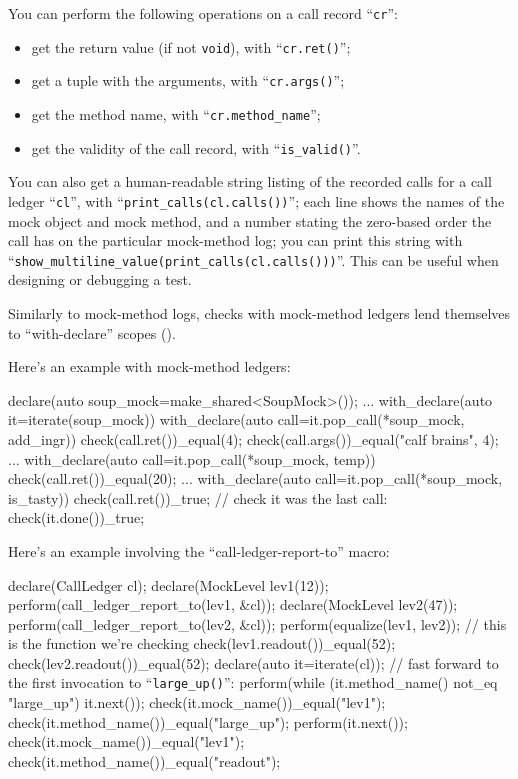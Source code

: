 \documentclass[twoside, a4paper, article]{memoir}
\begin{document}
You can perform the following operations on a call record ``\texttt{cr}'':
\begin{itemize}
\item get the return value (if not \texttt{void}), with ``\texttt{cr.ret()}'';
\item get a tuple with the arguments, with ``\texttt{cr.args()}'';
\item get the method name, with ``\texttt{cr.method\_name}'';
\item get the validity of the call record, with ``\texttt{is\_valid()}''.
\end{itemize}

You can also get a human-readable string listing of the recorded calls for a
call ledger ``\texttt{cl}'', with ``\texttt{print\_calls(cl.calls())}''; each
line shows the names of the mock object and mock method, and a number stating
the zero-based order the call has on the particular mock-method log; you can
print this string with
``\texttt{show\_multiline\_value(print\_calls(cl.calls()))}''.  This can be
  useful when designing or debugging a test.

Similarly to mock-method logs, checks with mock-method ledgers lend themselves
to ``with-declare'' scopes ().

Here's an example with mock-method ledgers:
\begin{cpplisting}
declare(auto soup_mock=make_shared<SoupMock>());
...
with_declare(auto it=iterate(soup_mock)) {
  with_declare(auto call=it.pop_call(*soup_mock, add_ingr)) {
    check(call.ret())_equal(4);
    check(call.args())_equal("calf brains", 4);
  }
  ...
  with_declare(auto call=it.pop_call(*soup_mock, temp))
    check(call.ret())_equal(20);
  ...
  with_declare(auto call=it.pop_call(*soup_mock, is_tasty))
    check(call.ret())_true;
  // check it was the last call:
  check(it.done())_true;
}
\end{cpplisting}

Here's an example involving the ``call-ledger-report-to'' macro:
\begin{cpplisting}
declare(CallLedger cl);
declare(MockLevel lev1(12));
perform(call_ledger_report_to(lev1, &cl));
declare(MockLevel lev2(47));
perform(call_ledger_report_to(lev2, &cl));
perform(equalize(lev1, lev2)); // this is the function we're checking
check(lev1.readout())_equal(52);
check(lev2.readout())_equal(52);
declare(auto it=iterate(cl));
// fast forward to the first invocation to ``\texttt{large\_up()}'':
perform(while (it.method_name() not_eq "large_up")
          it.next());
check(it.mock_name())_equal("lev1");
check(it.method_name())_equal("large_up");
perform(it.next());
check(it.mock_name())_equal("lev1");
check(it.method_name())_equal("readout");
\end{cpplisting}
\end{document}
